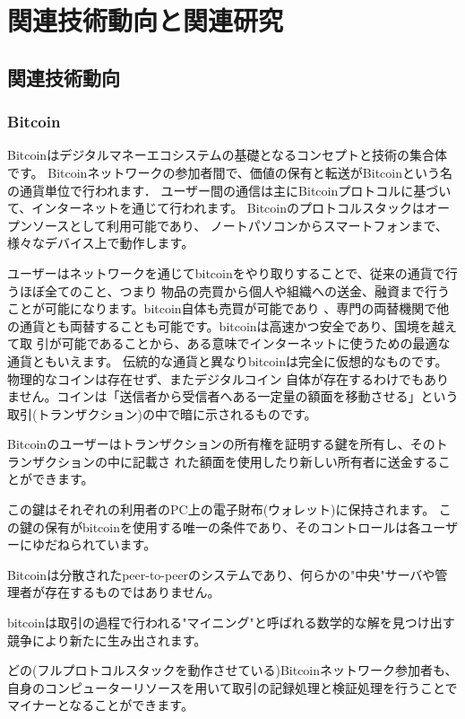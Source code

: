 \documentclass[a4paper,12pt]{jsarticle}
\begin{document}
\newpage
\section{関連技術動向と関連研究}
\subsection{関連技術動向}
\subsubsection{Bitcoin}
Bitcoinはデジタルマネーエコシステムの基礎となるコンセプトと技術の集合体です。
Bitcoinネットワークの参加者間で、価値の保有と転送がBitcoinという名の通貨単位で行われます．
ユーザー間の通信は主にBitcoinプロトコルに基づいて、インターネットを通じて行われます。
Bitcoinのプロトコルスタックはオープンソースとして利用可能であり、
ノートパソコンからスマートフォンまで、様々なデバイス上で動作します。

ユーザーはネットワークを通じてbitcoinをやり取りすることで、従来の通貨で行うほぼ全てのこと、つまり
物品の売買から個人や組織への送金、融資まで行うことが可能になります。bitcoin自体も売買が可能であり
、専門の両替機関で他の通貨とも両替することも可能です。bitcoinは高速かつ安全であり、国境を越えて取
引が可能であることから、ある意味でインターネットに使うための最適な通貨ともいえます。
伝統的な通貨と異なりbitcoinは完全に仮想的なものです。物理的なコインは存在せず、またデジタルコイン
自体が存在するわけでもありません。コインは「送信者から受信者へある一定量の額面を移動させる」という
取引(トランザクション)の中で暗に示されるものです。

Bitcoinのユーザーはトランザクションの所有権を証明する鍵を所有し、そのトランザクションの中に記載さ
れた額面を使用したり新しい所有者に送金することができます。 

この鍵はそれぞれの利用者のPC上の電子財布(ウォレット)に保持されます。 
この鍵の保有がbitcoinを使用する唯一の条件であり、そのコントロールは各ユーザーにゆだねられています。

Bitcoinは分散されたpeer-to-peerのシステムであり、何らかの"中央"サーバや管理者が存在するものではありません。

bitcoinは取引の過程で行われる"マイニング"と呼ばれる数学的な解を見つけ出す競争により新たに生み出されます。

どの(フルプロトコルスタックを動作させている)Bitcoinネットワーク参加者も、
自身のコンピューターリソースを用いて取引の記録処理と検証処理を行うことでマイナーとなることができます。
\end{document}
